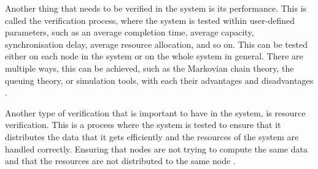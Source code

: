 Another thing that needs to be verified in the system is its performance. This is called the verification process, where the system is tested within user-defined parameters, such as an average completion time, average capacity, synchronisation delay, average resource allocation, and so on. This can be tested either on each node in the system or on the whole system in general. There are multiple ways, this can be achieved, such as the Markovian chain theory, the queuing theory, or simulation tools, with each their advantages and disadvantages \cite{grid_workflow_validation}.

Another type of verification that is important to have in the system, is resource verification. This is a process where the system is tested to ensure that it distributes the data that it gets efficiently and the resources of the system are handled correctly. Ensuring that nodes are not trying to compute the same data and that the resources are not distributed to the same node \cite{grid_workflow_validation}.